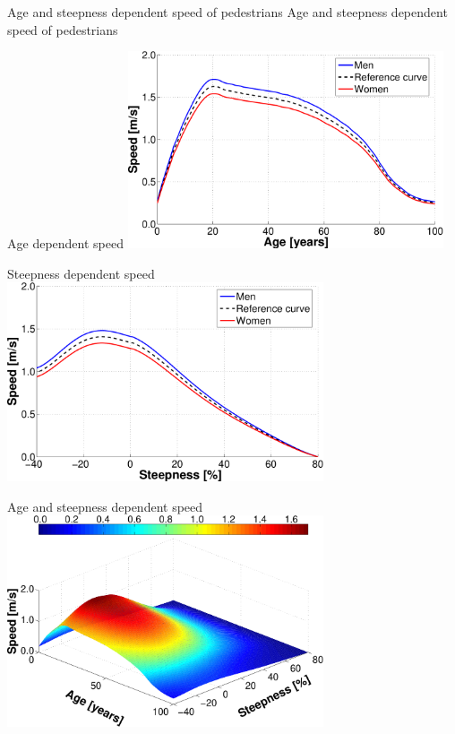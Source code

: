 \createfigure%
{Age and steepness dependent speed of pedestrians}%
{Age and steepness dependent speed of pedestrians}%
{\label{fig:labelWalkTravelTimes}}%
{%
  \createsubfigure%
  {Age dependent speed}%
  {\includegraphics[width=0.70\textwidth, angle=0]{extending/figures/MultiModalSimulation/pedestriansAge}}%
  {\label{fig:labelPedestriansAge}}%
  {\vspace{3mm}}%

  \createsubfigure%
  {Steepness dependent speed}%
  {\includegraphics[width=0.70\textwidth, angle=0]{extending/figures/MultiModalSimulation/pedestriansSteepness}}%
  {\label{fig:labelPedestriansSteepness}}%
  {\vspace{3mm}}%

  \createsubfigure%
  {Age and steepness dependent speed}%
  {\includegraphics[width=0.70\textwidth, angle=0]{extending/figures/MultiModalSimulation/pedestrians3d}}%
  {\label{fig:labelPedestriansAgeSteepness3d}}%
  {}%
}%
{}

